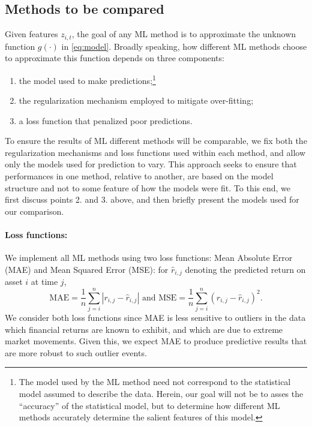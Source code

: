 \documentclass{article}
\begin{document}
\subsection{Methods to be compared}Given features $z_{i,t}$, the goal of any ML method is to approximate the unknown function $g(\cdot)$ in \ref{eq:model}.  Broadly speaking, how different ML methods choose to approximate this function depends on three components:
\begin{enumerate}
	\item the model used to make predictions;\footnote{The model used by the ML method need not correspond to the statistical model assumed to describe the data. Herein, our goal will not be to asses the ``accuracy'' of the statistical model, but to determine how different ML methods accurately determine the salient features of this model. }
	\item the regularization mechanism employed to mitigate over-fitting; 
	\item a loss function that penalized poor predictions. 
\end{enumerate}


To ensure the results of ML different methods will be comparable, we fix both the regularization mechanisms and loss functions used within each method, and allow only the models used for prediction to vary. This approach seeks to ensure that performances in one method, relative to another, are based on the model structure and not to some feature of how the models were fit. To this end, we first discuss points 2. and 3. above, and then briefly present the models used for our comparison. 
\paragraph{Loss functions:} We implement all ML methods using two loss functions: Mean Absolute Error (MAE) and Mean Squared Error (MSE): for $\widehat{r}_{i,j}$ denoting the predicted return on asset $i$ at time $j$,
\begin{equation*}
\text{MAE} = \frac{1}{n} \sum_{j = i}^{n} |r_{i,j} - \widehat{r}_{i,j}|\text{ and }
\text{MSE} = \frac{1}{n} \sum_{j = i}^{n} \left( r_{i,j} - \widehat{r}_{i,j}\right) ^2.
\end{equation*}We consider both loss functions since MAE is less sensitive to outliers in the data which financial returns are known to exhibit, and which are due to extreme market movements. Given this, we expect MAE to  produce predictive results that are more robust to such outlier events. 
\end{document}
